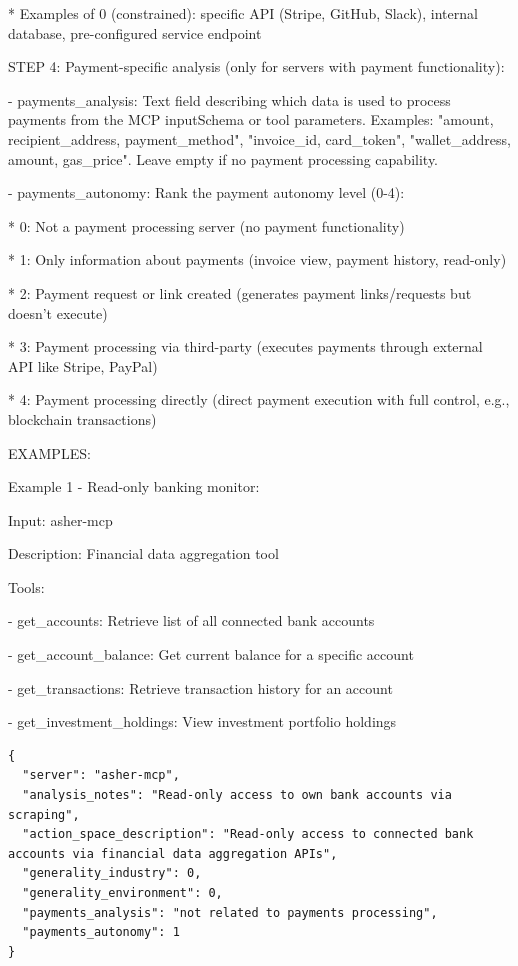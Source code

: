 \documentclass[manuscript,screen,nonacm,oneside]{acmart}
\begin{document}
* Examples of 0 (constrained): specific API (Stripe, GitHub, Slack), internal database, pre-configured service endpoint

STEP 4: Payment-specific analysis (only for servers with payment functionality):

- payments\_analysis: Text field describing which data is used to process payments from the MCP inputSchema or tool parameters. Examples: "amount, recipient\_address, payment\_method", "invoice\_id, card\_token", "wallet\_address, amount, gas\_price". Leave empty if no payment processing capability.

- payments\_autonomy: Rank the payment autonomy level (0-4):

* 0: Not a payment processing server (no payment functionality)

* 1: Only information about payments (invoice view, payment history, read-only)

* 2: Payment request or link created (generates payment links/requests but doesn't execute)

* 3: Payment processing via third-party (executes payments through external API like Stripe, PayPal)

* 4: Payment processing directly (direct payment execution with full control, e.g., blockchain transactions)

EXAMPLES:

Example 1 - Read-only banking monitor:

Input: asher-mcp

Description: Financial data aggregation tool

Tools:

- get\_accounts: Retrieve list of all connected bank accounts

- get\_account\_balance: Get current balance for a specific account

- get\_transactions: Retrieve transaction history for an account

- get\_investment\_holdings: View investment portfolio holdings

\begin{lstlisting}
{
  "server": "asher-mcp",
  "analysis_notes": "Read-only access to own bank accounts via scraping",
  "action_space_description": "Read-only access to connected bank accounts via financial data aggregation APIs",
  "generality_industry": 0,
  "generality_environment": 0,
  "payments_analysis": "not related to payments processing",
  "payments_autonomy": 1
}
\end{lstlisting}
\end{document}
